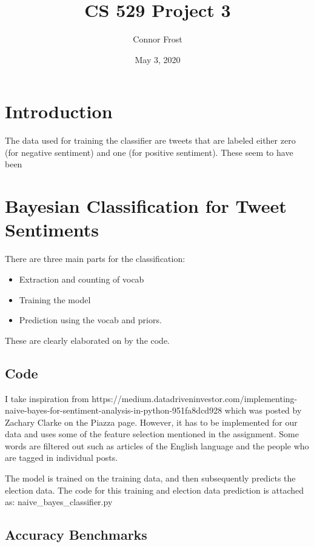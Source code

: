 \documentclass{article}
\title{CS 529 Project 3}
\author{Connor Frost}
\date{May 3, 2020}
\begin{document}
\maketitle

\section*{Introduction}

The data used for training the classifier are tweets that are labeled either zero (for negative sentiment) and one (for positive sentiment). These seem to have been 

\section{Bayesian Classification for Tweet Sentiments}

There are three main parts for the classification:

\begin{itemize}
    \item Extraction and counting of vocab
    \item Training the model
    \item Prediction using the vocab and priors.
\end{itemize}

\noindent These are clearly elaborated on by the code.

\subsection{Code}

I take inspiration from https://medium.datadriveninvestor.com/implementing-naive-bayes-for-sentiment-analysis-in-python-951fa8dcd928 which was posted by Zachary Clarke on the Piazza page. However, it has to be implemented for our data and uses some of the feature selection mentioned in the assignment. Some words are filtered out such as articles of the English language and the people who are tagged in individual posts.

\noindent The model is trained on the training data, and then subsequently predicts the election data. The code for this training and election data prediction is attached as: naive\_bayes\_classifier.py

\subsection{Accuracy Benchmarks}
\end{document}
